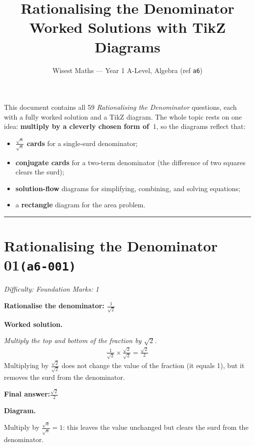 \documentclass[11pt]{article}
\title{\textbf{Rationalising the Denominator}\\[0.3em]\large Worked Solutions with TikZ Diagrams}
\author{Wisest Maths --- Year 1 A-Level, Algebra (ref \texttt{a6})}
\date{}
\newcommand{\question}[1]{\par\medskip\noindent\textbf{#1}\par}
\begin{document}
\maketitle
\noindent This document contains all 59 \emph{Rationalising the Denominator} questions, each with a
fully worked solution and a TikZ diagram. The whole topic rests on one idea: \textbf{multiply by a cleverly
chosen form of~$1$}, so the diagrams reflect that:
\begin{itemize}\setlength{\itemsep}{1pt}
  \item \textbf{$\frac{\sqrt a}{\sqrt a}$ cards} for a single-surd denominator;
  \item \textbf{conjugate cards} for a two-term denominator (the difference of two squares clears the surd);
  \item \textbf{solution-flow} diagrams for simplifying, combining, and solving equations;
  \item a \textbf{rectangle} diagram for the area problem.
\end{itemize}
\tableofcontents
\bigskip
\hrule

\section*{Rationalising the Denominator 01\quad\small\texttt{(a6-001)}}
\textit{Difficulty: Foundation \quad\textbar\quad Marks: 1}

\question{Rationalise the denominator: \( \frac{1}{\sqrt{2}} \)}

\textbf{Worked solution.}

\textit{Multiply the top and bottom of the fraction by \( \sqrt{2} \).}
\[\begin{gathered}
\frac{1}{\sqrt{2}} \times \frac{\sqrt{2}}{\sqrt{2}} = \frac{\sqrt{2}}{2}
\end{gathered}\]
Multiplying by \( \frac{\sqrt{2}}{\sqrt{2}} \) does not change the value of the fraction (it equals 1), but it removes the surd from the denominator.

\begin{answerbox}
\textbf{Final answer:}\quad \(\displaystyle \frac{\sqrt{2}}{2}\)
\end{answerbox}
\textbf{Diagram.}

\begin{center}
\end{center}
\small Multiply by $\frac{\sqrt{a}}{\sqrt{a}}=1$: this leaves the value unchanged but clears the surd from the denominator.\normalsize
\end{document}
